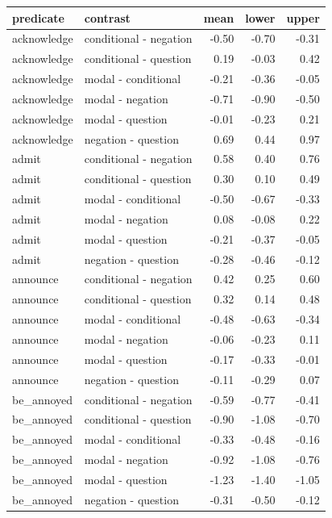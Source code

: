 \documentclass[a4paper,12pt,twoside]{article}
\begin{document}
    \begin{longtable}{llrrr}\toprule
     predicate & contrast & mean & lower & upper \\ \midrule
     acknowledge & conditional - negation & -0.50 & -0.70 & -0.31 \\ 
      acknowledge & conditional - question & 0.19 & -0.03 & 0.42 \\ 
      acknowledge & modal - conditional & -0.21 & -0.36 & -0.05 \\ 
      acknowledge & modal - negation & -0.71 & -0.90 & -0.50 \\ 
      acknowledge & modal - question & -0.01 & -0.23 & 0.21 \\ 
      acknowledge & negation - question & 0.69 & 0.44 & 0.97 \\ \midrule
      
      admit & conditional - negation & 0.58 & 0.40 & 0.76 \\ 
      admit & conditional - question & 0.30 & 0.10 & 0.49 \\ 
      admit & modal - conditional & -0.50 & -0.67 & -0.33 \\ 
      admit & modal - negation & 0.08 & -0.08 & 0.22 \\ 
      admit & modal - question & -0.21 & -0.37 & -0.05 \\ 
      admit & negation - question & -0.28 & -0.46 & -0.12 \\ \midrule
      
      announce & conditional - negation & 0.42 & 0.25 & 0.60 \\ 
      announce & conditional - question & 0.32 & 0.14 & 0.48 \\ 
      announce & modal - conditional & -0.48 & -0.63 & -0.34 \\ 
      announce & modal - negation & -0.06 & -0.23 & 0.11 \\ 
      announce & modal - question & -0.17 & -0.33 & -0.01 \\ 
      announce & negation - question & -0.11 & -0.29 & 0.07 \\ \midrule
      
      be\_annoyed & conditional - negation & -0.59 & -0.77 & -0.41 \\ 
      be\_annoyed & conditional - question & -0.90 & -1.08 & -0.70 \\ 
      be\_annoyed & modal - conditional & -0.33 & -0.48 & -0.16 \\ 
      be\_annoyed & modal - negation & -0.92 & -1.08 & -0.76 \\ 
      be\_annoyed & modal - question & -1.23 & -1.40 & -1.05 \\ 
      be\_annoyed & negation - question & -0.31 & -0.50 & -0.12 \\ \midrule
      

\end{longtable}
\end{document}
